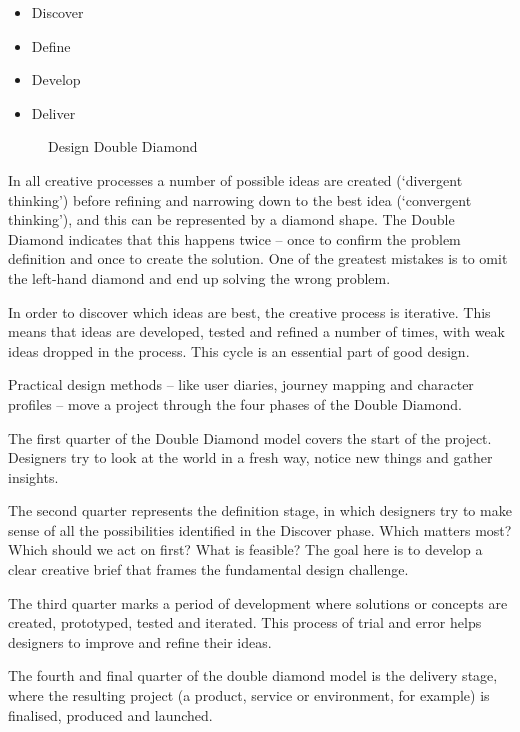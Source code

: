 \begin{itemize}
  \item Discover
  \item Define
  \item Develop
  \item Deliver
\end{itemize}

\begin{figure}[h!]
  \centering
  \resizebox{0.8\textwidth}{!}{
    
  }
  \caption[Design Double Diamond]{Design Double Diamond}\label{fig-dd}
\end{figure}

In all creative processes a number of possible ideas are created (`divergent thinking') before refining and narrowing down to the best idea (`convergent thinking'), and this can be represented by a diamond shape. The Double Diamond indicates that this happens twice – once to confirm the problem definition and once to create the solution. One of the greatest mistakes is to omit the left-hand diamond and end up solving the wrong problem.

In order to discover which ideas are best, the creative process is iterative. This means that ideas are developed, tested and refined a number of times, with weak ideas dropped in the process. This cycle is an essential part of good design.

Practical design methods -- like user diaries, journey mapping and character profiles -- move a project through the four phases of the Double Diamond. 

The first quarter of the Double Diamond model covers the start of the project. Designers try to look at the world in a fresh way, notice new things and gather insights.

The second quarter represents the definition stage, in which designers try to make sense of all the possibilities identified in the Discover phase. Which matters most? Which should we act on first? What is feasible? The goal here is to develop a clear creative brief that frames the fundamental design challenge.

The third quarter marks a period of development where solutions or concepts are created, prototyped, tested and iterated. This process of trial and error helps designers to improve and refine their ideas.

The fourth and final quarter of the double diamond model is the delivery stage, where the resulting project (a product, service or environment, for example) is finalised, produced and launched.

